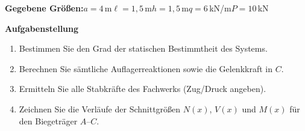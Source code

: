 \documentclass[a4paper,11pt]{article}
\begin{document}
\textbf{Gegebene Gr\"o\ss en:}\quad $a = 4$\,m\quad $\ell = 1,5$\,m\quad $h = 1,5$\,m\quad $q = 6$\,kN/m\quad $P = 10$\,kN
\par\medskip
\textbf{Aufgabenstellung}\par
\begin{enumerate}[label=\textbf{\arabic*.}]
  \item Bestimmen Sie den Grad der statischen Bestimmtheit des Systems.
  \item Berechnen Sie s\"amtliche Auflagerreaktionen sowie die Gelenkkraft in $C$.
  \item Ermitteln Sie alle Stabkr\"afte des Fachwerks (Zug/Druck angeben).
  \item Zeichnen Sie die Verl\"aufe der Schnittgr\"o\ss en $N(x)$, $V(x)$ und $M(x)$ f\"ur den Biegetr\"ager $A$--$C$.
\end{enumerate}
\end{document}
